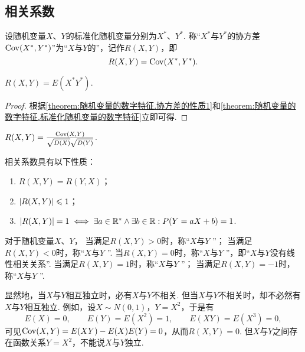 \subsection{相关系数}
\begin{definition}\label{definition:随机变量的数字特征.相关系数}
设随机变量\(X\)、\(Y\)的标准化随机变量分别为\(X^*\)、\(Y^*\).
称“\(X^*\)与\(Y^*\)的协方差\(\operatorname{Cov}(X^*,Y^*)\)”为“\(X\)与\(Y\)的”，记作\(R(X,Y)\)，即\[
R(X,Y) = \operatorname{Cov}(X^*,Y^*).
\]
\end{definition}

\begin{theorem}\label{theorem:随机变量的数字特征.相关系数的性质1}
\(R(X,Y)=E(X^* Y^*)\).
\begin{proof}
根据\cref{theorem:随机变量的数字特征.协方差的性质1}和\cref{theorem:随机变量的数字特征.标准化随机变量的数字特征}立即可得.
\end{proof}
\end{theorem}

\begin{theorem}\label{theorem:随机变量的数字特征.相关系数的性质2}
\(R(X,Y)=\frac{\operatorname{Cov}(X,Y)}{\sqrt{D(X)} \sqrt{D(Y)}}\).
\end{theorem}

\begin{property}
相关系数具有以下性质：
\begin{enumerate}
\item \(R(X,Y)=R(Y,X)\)；
\item \(\abs{R(X,Y)} \leqslant 1\)；
\item \(\abs{R(X,Y)}=1 \iff \exists a \in \mathbb{R}^* \land \exists b \in \mathbb{R} : P(Y=aX+b)=1\).
\end{enumerate}
\end{property}

\begin{definition}
对于随机变量\(X\)、\(Y\)，%
当满足\(R(X,Y)>0\)时，称“\(X\)与\(Y\) ”；
当满足\(R(X,Y)<0\)时，称“\(X\)与\(Y\) ”.
当\(R(X,Y)=0\)时，称“\(X\)与\(Y\) ”，即“\(X\)与\(Y\)没有线性相关关系”.
当满足\(R(X,Y)=1\)时，称“\(X\)与\(Y\) ”；
当满足\(R(X,Y)=-1\)时，称“\(X\)与\(Y\) ”.
\end{definition}

显然地，当\(X\)与\(Y\)相互独立时，必有\(X\)与\(Y\)不相关.
但当\(X\)与\(Y\)不相关时，却不必然有\(X\)与\(Y\)相互独立.
例如，设\(X \sim N(0,1)\)，\(Y=X^2\)，于是有\[
E(X) = 0,
\qquad
E(Y) = E(X^2) = 1,
\qquad
E(XY) = E(X^3) = 0,
\]
可见\(\operatorname{Cov}(X,Y) = E(XY) - E(X) E(Y) = 0\)，从而\(R(X,Y) = 0\).
但\(X\)与\(Y\)之间存在函数关系\(Y=X^2\)，不能说\(X\)与\(Y\)独立.
